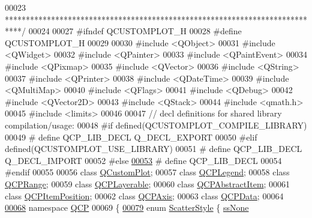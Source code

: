 \begin{DoxyCode}
00023 \textcolor{comment}{****************************************************************************/}
00024 
00027 \textcolor{preprocessor}{#ifndef QCUSTOMPLOT\_H}
00028 \textcolor{preprocessor}{#define QCUSTOMPLOT\_H}
00029 
00030 \textcolor{preprocessor}{#include <QObject>}
00031 \textcolor{preprocessor}{#include <QWidget>}
00032 \textcolor{preprocessor}{#include <QPainter>}
00033 \textcolor{preprocessor}{#include <QPaintEvent>}
00034 \textcolor{preprocessor}{#include <QPixmap>}
00035 \textcolor{preprocessor}{#include <QVector>}
00036 \textcolor{preprocessor}{#include <QString>}
00037 \textcolor{preprocessor}{#include <QPrinter>}
00038 \textcolor{preprocessor}{#include <QDateTime>}
00039 \textcolor{preprocessor}{#include <QMultiMap>}
00040 \textcolor{preprocessor}{#include <QFlags>}
00041 \textcolor{preprocessor}{#include <QDebug>}
00042 \textcolor{preprocessor}{#include <QVector2D>}
00043 \textcolor{preprocessor}{#include <QStack>}
00044 \textcolor{preprocessor}{#include <qmath.h>}
00045 \textcolor{preprocessor}{#include <limits>}
00046 
00047 \textcolor{comment}{// decl definitions for shared library compilation/usage:}
00048 \textcolor{preprocessor}{#if defined(QCUSTOMPLOT\_COMPILE\_LIBRARY)}
00049 \textcolor{preprocessor}{#  define QCP\_LIB\_DECL Q\_DECL\_EXPORT}
00050 \textcolor{preprocessor}{#elif defined(QCUSTOMPLOT\_USE\_LIBRARY)}
00051 \textcolor{preprocessor}{#  define QCP\_LIB\_DECL Q\_DECL\_IMPORT}
00052 \textcolor{preprocessor}{#else}
\hypertarget{a00116_source_l00053}{}\hyperlink{a00116_a5eaab02224a642ded7fb8951e973a02c}{00053} \textcolor{preprocessor}{#  define QCP\_LIB\_DECL}
00054 \textcolor{preprocessor}{#endif}
00055 
00056 \textcolor{keyword}{class }\hyperlink{a00030_d8/d00/a00186}{QCustomPlot};
00057 \textcolor{keyword}{class }\hyperlink{a00045}{QCPLegend};
00058 \textcolor{keyword}{class }\hyperlink{a00049}{QCPRange};
00059 \textcolor{keyword}{class }\hyperlink{a00044}{QCPLayerable};
00060 \textcolor{keyword}{class }\hyperlink{a00022}{QCPAbstractItem};
00061 \textcolor{keyword}{class }\hyperlink{a00038}{QCPItemPosition};
00062 \textcolor{keyword}{class }\hyperlink{a00025}{QCPAxis};
00063 \textcolor{keyword}{class }\hyperlink{a00030_d2/d94/a00184}{QCPData};
00064 
\hypertarget{a00116_source_l00068}{}\hyperlink{a00143}{00068} \textcolor{keyword}{namespace }\hyperlink{a00143}{QCP}
00069 \{
\hypertarget{a00116_source_l00079}{}\hyperlink{a00143_af66d0711d42fe78d96c28abadc67f26fa3ee9f603bc4623e9b98011e8829aad1d}{00079} \textcolor{keyword}{enum} \hyperlink{a00143_af66d0711d42fe78d96c28abadc67f26f}{ScatterStyle} \{ \hyperlink{a00143_af66d0711d42fe78d96c28abadc67f26fa3ee9f603bc4623e9b98011e8829aad1d}{ssNone}       

\end{DoxyCode}
